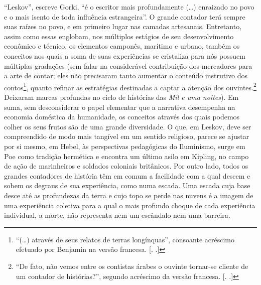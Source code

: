``Leskov'', escreve Gorki, ``é o escritor mais profundamente (\ldots{})
enraizado no povo e o mais isento de toda influência estrangeira''. O
grande contador terá sempre suas raízes no povo, e em primeiro lugar nas
camadas artesanais. Entretanto, assim como essas englobam, nos múltiplos
estágios de seu desenvolvimento econômico e técnico, os elementos
camponês, marítimo e urbano, também os conceitos nos quais a soma de
suas experiências se cristaliza para nós possuem múltiplas gradações 
(sem falar na considerável contribuição dos mercadores para a arte de
contar; eles não precisaram tanto aumentar o conteúdo instrutivo dos
contos\footnote{``(\ldots{}) através de seus relatos de terras longínquas'',
  consoante acréscimo efetuado por Benjamin na versão francesa. [. 
  .]}, quanto refinar as estratégias destinadas a captar a atenção
dos ouvintes.\footnote{``De fato, não vemos entre os contistas árabes o
  ouvinte tornar-se cliente de um contador de histórias?'', segundo
  acréscimo da versão francesa. [. .]} Deixaram marcas
profundas no ciclo de histórias das \emph{Mil e uma noites}). Em suma,
sem desconsiderar o papel elementar que a narrativa desempenha na
economia doméstica da humanidade, os conceitos através dos quais podemos
colher os seus frutos são de uma grande diversidade. O que, em Leskov,
deve ser compreendido de modo mais tangível em um sentido religioso,
parece se ajustar por si mesmo, em Hebel, às perspectivas pedagógicas do
Iluminismo, surge em Poe como tradição hermética e encontra um último
asilo em Kipling, no campo de ação de marinheiros e soldados coloniais
britânicos. Por outro lado, todos os grandes contadores de história têm
em comum a facilidade com a qual descem e sobem os degraus de sua
experiência, como numa escada. Uma escada cuja base desce até as
profundezas da terra e cujo topo se perde nas nuvens é a imagem de uma
experiência coletiva para a qual o mais profundo choque de cada
experiência individual, a morte, não representa nem um escândalo nem uma
barreira.

